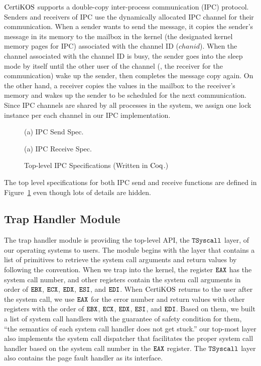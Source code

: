 $\mathrm{CertiKOS}$ supports a double-copy inter-process communication (IPC) protocol.
Senders and receivers of IPC use the dynamically allocated IPC channel for their communication. 
When a sender wants to send the message, 
it copies the sender's message in its memory to the mailbox in the kernel (the designated kernel memory pages for IPC) associated with the channel ID ($chanid$).
When the channel associated with the channel ID is busy, the sender goes into the sleep mode by itself until the other user of the channel
(\ie, the receiver for the communication) wake up the sender, then completes the message copy again. 
On the other hand, a receiver copies the values in the mailbox to the receiver's memory and wakes up the sender to be scheduled for the next communication. 
Since IPC channels are shared by all processes in the system, 
we assign one lock instance per each channel in our IPC implementation.
 \begin{figure}
\begin{center}

(a) IPC Send Spec.
 
(a) IPC Receive Spec.
\end{center}
\caption{Top-level IPC Specifications (Written in $\mathrm{Coq}$.)}
\label{fig:chapter:certikos:ipc-specs}
\end{figure}
The top level specifications for both IPC send and receive functions are defined in Figure~\ref{fig:chapter:certikos:ipc-specs}
even though lots of details are hidden. 


\subsection{Trap Handler Module}
\label{chapter:certikos:subsec:trap-handler-module}

The trap handler module is providing the top-level API, the ${\mathrm{\texttt{TSyscall}}}$ layer, of our operating systems to users.  
The module begins with the layer that contains a list of primitives to retrieve the system call arguments and return values
by following the convention.
When we trap into the kernel, the register ${\mathrm{\texttt{EAX}}}$ has the system call number, and other registers contain the system call arguments in order of ${\mathrm{\texttt{EBX}}}$, ${\mathrm{\texttt{ECX}}}$, ${\mathrm{\texttt{EDX}}}$, ${\mathrm{\texttt{ESI}}}$, and ${\mathrm{\texttt{EDI}}}$. 
When $\mathrm{CertiKOS}$ returns to the user after the system call, we use ${\mathrm{\texttt{EAX}}}$ for the error number and 
return values with other registers with the order of 
 ${\mathrm{\texttt{EBX}}}$, ${\mathrm{\texttt{ECX}}}$, ${\mathrm{\texttt{EDX}}}$, ${\mathrm{\texttt{ESI}}}$, and ${\mathrm{\texttt{EDI}}}$. 
Based on them, 
we built a list of system call handlers with the guarantee of safety condition for them, 
``the semantics of each system call handler does not get stuck.'' 
our top-most layer also implements the system call dispatcher that facilitates the proper system call handler based on the system call number in the ${\mathrm{\texttt{EAX}}}$ register.
The ${\mathrm{\texttt{TSyscall}}}$ layer also contains the page fault handler as its interface.

